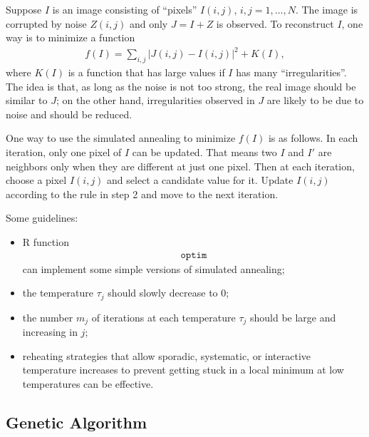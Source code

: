 \begin{frame}
  Suppose $I$ is an image consisting of ``pixels'' $I(i,j)$,
  $i,j=1,\ldots, N$.  The image is corrupted by noise $Z(i,j)$ and
  only $J = I+Z$ is observed.   To reconstruct $I$, one way is
  to minimize a function
  \begin{align*}
    f(I) = \sum_{i,j} |J(i,j) - I(i,j)|^2 + K(I),
  \end{align*}
  where $K(I)$ is a function that has large values if $I$ has many
  ``irregularities''.  The idea is that, as long as the noise is not
  too strong, the real image should be similar to $J$; on the other
  hand, irregularities observed in $J$ are likely to be due to noise
  and should be reduced.
  
  One way to use the simulated annealing to minimize $f(I)$ is as
  follows.  In each iteration, only one pixel of $I$ can be updated.
  That means two $I$ and $I'$ are neighbors only when they are
  different at just one pixel.  Then at each iteration, choose a
  pixel $I(i,j)$ and select a candidate value for it.  Update
  $I(i,j)$ according to the rule in step 2 and move to the next
  iteration.
\end{frame}


\begin{frame}
  Some guidelines:
  \begin{itemize}
  \item R function
    \begin{align*}
      \texttt{optim}
    \end{align*}
    can implement some simple versions of simulated annealing;
  \item the temperature $\tau_j$ should slowly decrease to 0;
  \item the number $m_j$ of iterations at each temperature $\tau_j$
    should be large and increasing in $j$;
  \item reheating strategies that allow sporadic, systematic, or
    interactive temperature increases to prevent getting stuck in a
    local minimum at low temperatures can be effective.
  \end{itemize}
\end{frame}


\subsection{Genetic Algorithm}

